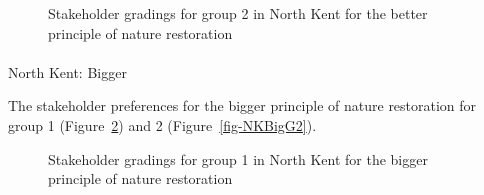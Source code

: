 \documentclass[
  12pt,
  letterpaper,
  DIV=11,
  numbers=noendperiod]{scrartcl}
\makeatletter
\let\oldparagraph\paragraph
\renewcommand{\paragraph}{
    \@ifstar
      \xxxParagraphStar
      \xxxParagraphNoStar
  }
\newcommand{\xxxParagraphStar}[1]{\oldparagraph*{#1}\mbox{}}
\newcommand{\xxxParagraphNoStar}[1]{\oldparagraph{#1}\mbox{}}
\makeatother
\begin{document}
\begin{figure}[H]


\caption{\label{fig-NKBetterG2}Stakeholder gradings for group 2 in North
Kent for the better principle of nature restoration}

\end{figure}%

\newpage{}

\paragraph{North Kent: Bigger}\label{north-kent-bigger}

The stakeholder preferences for the bigger principle of nature
restoration for group 1 (Figure~\ref{fig-NKBigG1}) and 2
(Figure~\ref{fig-NKBigG2}).

\begin{figure}[H]


\caption{\label{fig-NKBigG1}Stakeholder gradings for group 1 in North
Kent for the bigger principle of nature restoration}

\end{figure}%
\end{document}
